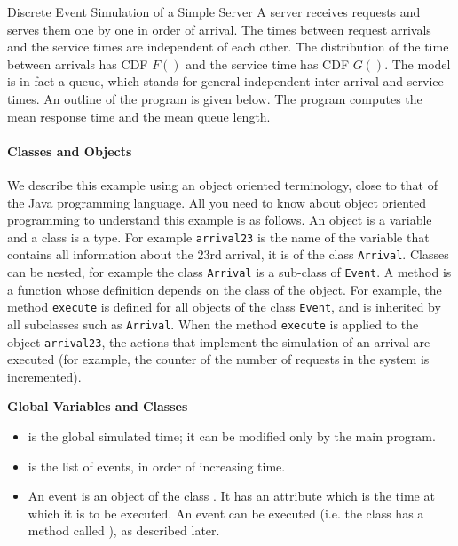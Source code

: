 \begin{ex}{Discrete Event Simulation of a Simple Server}
 A server receives requests and serves them one
by one in order of arrival. The times between request arrivals and
the service times are independent of each other. The distribution of
the time between arrivals has CDF $F()$ and the service time has CDF
$G()$. The model is in fact a  queue, which stands for
general independent inter-arrival and service times. An outline of
the program is given below. The program computes the mean response
time and the mean queue length.

{\footnotesize
\paragraph{Classes and Objects} We describe this
example using an object oriented terminology, close to that of the
Java programming language. All you need to know about object
oriented programming to understand this example is as follows. An
object is a variable and a class is a type. For example
\texttt{arrival23} is the name of the variable that contains all
information about the 23rd arrival, it is of the class
\texttt{Arrival}. Classes can be nested, for example the class
\texttt{Arrival} is a sub-class of \texttt{Event}. A method is a
function whose definition depends on the class of the object. For
example, the method \texttt{execute} is defined for all objects of
the class \texttt{Event}, and is inherited by all subclasses such
as \texttt{Arrival}. When the method \texttt{execute} is applied
to the object \texttt{arrival23}, the actions that implement the
simulation of an arrival are executed (for example, the counter of
the number of requests in the system is incremented). \\ }

\textbf{Global Variables and Classes} \noitemsep
\begin{itemize}
\item {} is the global simulated time;
    it can be modified only by the main program.
\item {} is the list of events, in order of
    increasing time.

\item  An event is an object of the class . It has an
attribute  which is the time at which it is to be
executed. An event can be executed (i.e. the  class has
a method called ), as described later.


\end{itemize}
\end{ex}
